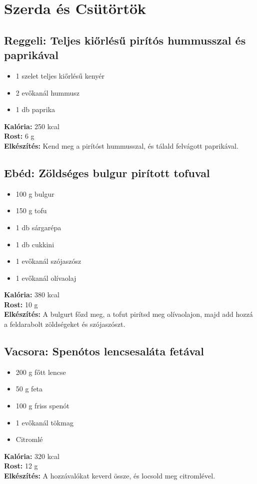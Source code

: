 \newpage

\section{Szerda és Csütörtök}
\sordisz
\subsection{Reggeli: Teljes kiőrlésű pirítós hummusszal és paprikával}
\begin{itemize}
    \item 1 szelet teljes kiőrlésű kenyér
    \item 2 evőkanál hummusz
    \item 1 db paprika
\end{itemize}
\textbf{Kalória:} 250 kcal \\
\textbf{Rost:} 6 g \\
\textbf{Elkészítés:} Kend meg a pirítóst hummusszal, és tálald felvágott paprikával.

\sordisz
\subsection{Ebéd: Zöldséges bulgur pirított tofuval}
\begin{itemize}
    \item 100 g bulgur
    \item 150 g tofu
    \item 1 db sárgarépa
    \item 1 db cukkini
    \item 1 evőkanál szójaszósz
    \item 1 evőkanál olívaolaj
\end{itemize}
\textbf{Kalória:} 380 kcal \\
\textbf{Rost:} 10 g \\
\textbf{Elkészítés:} A bulgurt főzd meg, a tofut pirítsd meg olívaolajon, majd add hozzá a feldarabolt zöldségeket és szójaszószt.

\sordisz
\subsection{Vacsora: Spenótos lencsesaláta fetával}
\begin{itemize}
    \item 200 g főtt lencse
    \item 50 g feta
    \item 100 g friss spenót
    \item 1 evőkanál tökmag
    \item Citromlé
\end{itemize}
\textbf{Kalória:} 320 kcal \\
\textbf{Rost:} 12 g \\
\textbf{Elkészítés:} A hozzávalókat keverd össze, és locsold meg citromlével.

